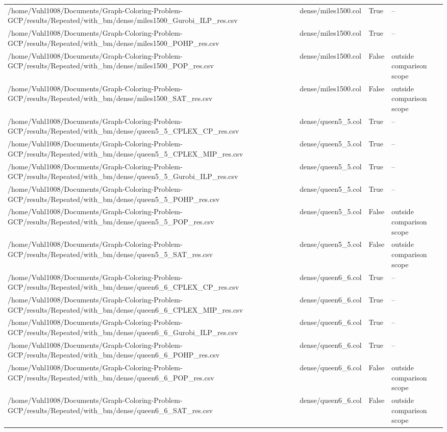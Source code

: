 \begin{table}[htbp]
\begin{tabular}{llll}
/home/Vuhl1008/Documents/Graph-Coloring-Problem-GCP/results/Repeated/with\_bm/dense/miles1500\_Gurobi\_ILP\_res.csv & dense/miles1500.col & True & -- \\
/home/Vuhl1008/Documents/Graph-Coloring-Problem-GCP/results/Repeated/with\_bm/dense/miles1500\_POHP\_res.csv & dense/miles1500.col & True & -- \\
/home/Vuhl1008/Documents/Graph-Coloring-Problem-GCP/results/Repeated/with\_bm/dense/miles1500\_POP\_res.csv & dense/miles1500.col & False & outside comparison scope \\
/home/Vuhl1008/Documents/Graph-Coloring-Problem-GCP/results/Repeated/with\_bm/dense/miles1500\_SAT\_res.csv & dense/miles1500.col & False & outside comparison scope \\
/home/Vuhl1008/Documents/Graph-Coloring-Problem-GCP/results/Repeated/with\_bm/dense/queen5\_5\_CPLEX\_CP\_res.csv & dense/queen5\_5.col & True & -- \\
/home/Vuhl1008/Documents/Graph-Coloring-Problem-GCP/results/Repeated/with\_bm/dense/queen5\_5\_CPLEX\_MIP\_res.csv & dense/queen5\_5.col & True & -- \\
/home/Vuhl1008/Documents/Graph-Coloring-Problem-GCP/results/Repeated/with\_bm/dense/queen5\_5\_Gurobi\_ILP\_res.csv & dense/queen5\_5.col & True & -- \\
/home/Vuhl1008/Documents/Graph-Coloring-Problem-GCP/results/Repeated/with\_bm/dense/queen5\_5\_POHP\_res.csv & dense/queen5\_5.col & True & -- \\
/home/Vuhl1008/Documents/Graph-Coloring-Problem-GCP/results/Repeated/with\_bm/dense/queen5\_5\_POP\_res.csv & dense/queen5\_5.col & False & outside comparison scope \\
/home/Vuhl1008/Documents/Graph-Coloring-Problem-GCP/results/Repeated/with\_bm/dense/queen5\_5\_SAT\_res.csv & dense/queen5\_5.col & False & outside comparison scope \\
/home/Vuhl1008/Documents/Graph-Coloring-Problem-GCP/results/Repeated/with\_bm/dense/queen6\_6\_CPLEX\_CP\_res.csv & dense/queen6\_6.col & True & -- \\
/home/Vuhl1008/Documents/Graph-Coloring-Problem-GCP/results/Repeated/with\_bm/dense/queen6\_6\_CPLEX\_MIP\_res.csv & dense/queen6\_6.col & True & -- \\
/home/Vuhl1008/Documents/Graph-Coloring-Problem-GCP/results/Repeated/with\_bm/dense/queen6\_6\_Gurobi\_ILP\_res.csv & dense/queen6\_6.col & True & -- \\
/home/Vuhl1008/Documents/Graph-Coloring-Problem-GCP/results/Repeated/with\_bm/dense/queen6\_6\_POHP\_res.csv & dense/queen6\_6.col & True & -- \\
/home/Vuhl1008/Documents/Graph-Coloring-Problem-GCP/results/Repeated/with\_bm/dense/queen6\_6\_POP\_res.csv & dense/queen6\_6.col & False & outside comparison scope \\
/home/Vuhl1008/Documents/Graph-Coloring-Problem-GCP/results/Repeated/with\_bm/dense/queen6\_6\_SAT\_res.csv & dense/queen6\_6.col & False & outside comparison scope \\
\hline
\end{tabular}
\end{table}
